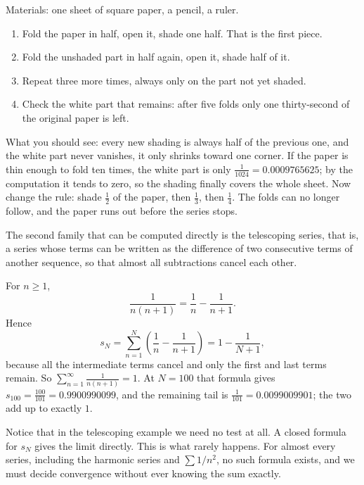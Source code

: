 \begin{tangan}
Materials: one sheet of square paper, a pencil, a ruler.

\begin{enumerate}
\item Fold the paper in half, open it, shade one half. That is the first piece.
\item Fold the unshaded part in half again, open it, shade half of it.
\item Repeat three more times, always only on the part not yet shaded.
\item Check the white part that remains: after five folds only one thirty-second of the
      original paper is left.
\end{enumerate}

What you should see: every new shading is always half of the previous one, and the white
part never vanishes, it only shrinks toward one corner. If the paper is thin enough to fold
ten times, the white part is only $\tfrac{1}{1024} = 0.0009765625$; by the computation it
tends to zero, so the shading finally covers the whole sheet. Now change the rule: shade
$\tfrac12$ of the paper, then $\tfrac13$, then $\tfrac14$. The folds can no longer follow,
and the paper runs out before the series stops.
\end{tangan}

The second family that can be computed directly is the telescoping series, that is, a series whose terms can be written as the difference of two consecutive
terms of another sequence, so that almost all subtractions cancel each other.

\begin{contoh}
For $n \ge 1$,
\[
  \frac{1}{n(n+1)} = \frac{1}{n} - \frac{1}{n+1}.
\]
Hence
\[
  s_N = \sum_{n=1}^{N} \left(\frac{1}{n} - \frac{1}{n+1}\right)
      = 1 - \frac{1}{N+1},
\]
because all the intermediate terms cancel and only the first and last terms remain. So
$\sum_{n=1}^{\infty} \frac{1}{n(n+1)} = 1$. At $N=100$ that formula gives
$s_{100} = \tfrac{100}{101} = 0.9900990099$, and the remaining tail is
$\tfrac{1}{101} = 0.0099009901$; the two add up to exactly $1$.
\end{contoh}

Notice that in the telescoping example we need no test at all. A closed formula for $s_N$
gives the limit directly. This is what rarely happens. For almost every series, including
the harmonic series and $\sum 1/n^2$, no such formula exists, and we must decide
convergence without ever knowing the sum exactly.

